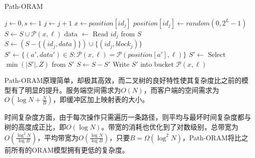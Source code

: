 \begin{algorithm}[H]
    \label{alg:Path}
    \caption{Path-ORAM}
    \begin{algorithmic}[1]
        \State $j \gets 0, s \gets 1$
            \State $j \gets j+1$
            \State $x \gets position[id_j]$
            \State $position[id_j] \gets random(0,2^L-1)$
                \State $S \gets S \cup \mathcal{P}(x,\ell)$
            \EndFor
            \State data $\gets$ Read $id_j$ from $S$
                \State $S \gets (S-\{(id_j,data)\})\cup\{(id_j,block_j)\}$
            \EndIf
                \State $S' \gets \{(a',data')\in S: \mathcal{P}(x,\ell)=\mathcal{P}(position[a'],\ell)\}$
                \State $S' \gets$ Select $\min(|S'|,Z)$ from $S'$
                \State $S \gets S - S'$
                \State Write $S'$ into bucket $\mathcal{P}(x,\ell)$
            \EndFor
        \EndWhile
    \end{algorithmic}
\end{algorithm}
Path-ORAM原理简单，却极其高效，而二叉树的良好特性使其复杂度比之前的模型有了明显的提升。服务端空间需求为$O(N)$，而客户端的空间需求为$O(\log N+\frac{N}{B})$，即缓冲区加上映射表的大小。\par
时间复杂度方面，由于每次操作只需遍历一条路径，则平均与最坏时间复杂度都与树的高度成正比，即$O(\log N)$。带宽的消耗也优化到了对数级别，总带宽为$O(\frac{\log^2N}{\log B})$，平均带宽为$O(\frac{\log N}{\log B})$，只要$B=\Omega(\log^2N)$，Path-ORAM将比之前所有的ORAM模型拥有更低的复杂度\cite{ref9}。